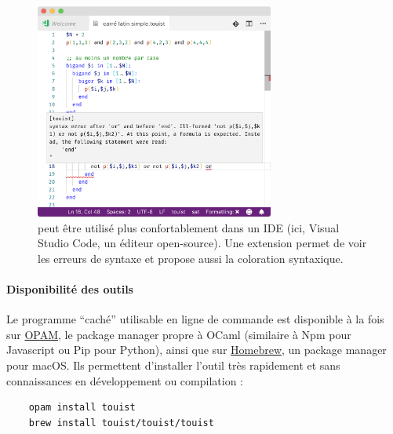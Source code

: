 \begin{figure}[!ht] \centering
  \includegraphics[width=0.7\textwidth]{figures/vscode-touist-white-with-err}
  \caption{\touist peut être utilisé plus confortablement dans un IDE (ici, Visual Studio Code, un éditeur open-source). Une extension permet de voir les erreurs de syntaxe et propose aussi la coloration syntaxique.} \label{fig:touist-vscode}
\end{figure}

\paragraph{Disponibilité des outils}

Le programme \enquote{caché} utilisable en ligne de commande est disponible à la fois sur \href{https://opam.ocaml.org/packages/touist}{OPAM}, le package manager propre à OCaml (similaire à Npm pour Javascript ou Pip pour Python), ainsi que sur \href{https://github.com/touist/homebrew-touist}{Homebrew}, un package manager pour macOS. Ils permettent d'installer l'outil très rapidement et sans connaissances en développement ou compilation :

\begin{verbatim}
    opam install touist
    brew install touist/touist/touist
\end{verbatim}